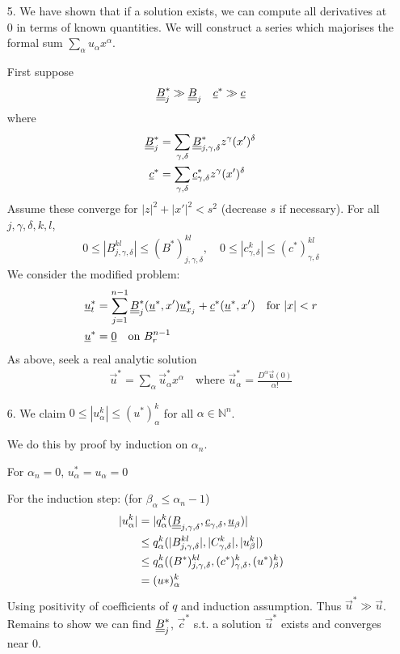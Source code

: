 \documentclass[10pt,a4paper]{report}
\newenvironment{proof}
{\begin{changemargin}{1cm}{0.5cm} 
	}%
	{\end{changemargin}
}
\begin{document}
\begin{proof}
\begin{itemize}
\item[5.] We have shown that if a solution exists, we can compute all derivatives at $0$ in terms of known quantities. We will construct a series which majorises the formal sum $\sum_{\alpha} u_{\alpha}x^{\alpha}$.

\quad First suppose 
\begin{align*}
\underline{\underline{B}}_j^{*} \gg \underline{\underline{B}}_j \quad \underline{c}^* \gg \underline{c}
\end{align*}
where
\begin{align*}
\underline{\underline{B}}_j^{*} &= \sum_{\gamma, \delta} \underline{\underline{B}}_{j,\gamma,\delta}^{*} z^{\gamma} (x')^{\delta} \\
\underline{c}^* &= \sum_{\gamma, \delta} \underline{c}_{\gamma,\delta}^{*} z^{\gamma} (x')^{\delta}
\end{align*}
Assume these converge for $|z|^2 + |x'|^2 <s^2$ (decrease $s$ if necessary). For all $j,\gamma, \delta, k,l$,
\begin{align*}
0\leq |B^{kl}_{j,\gamma,\delta}| \leq (B^*)^{kl}_{j,\gamma,\delta}, \quad 0\leq |c^k_{\gamma, \delta} | \leq (c^*)^{kl}_{\gamma, \delta}
\end{align*}
We consider the modified problem:
\begin{align*}
\underline{u}^*_t &= \sum_{j=1}^{n-1} \underline{\underline{B}}^*_j (\underline{u}^*, x') \underline{u}^*_{x_j} + \underline{c}^*(\underline{u}^*,x') \quad \text{for } |x| <r \\
\underline{u}^* &= \underline{0} \quad \text{on } B_r^{n-1}
\end{align*}
As above, seek a real analytic solution
\begin{align*}
\vec{u}^* = \sum_{\alpha} \vec{u}^*_{\alpha} x^{\alpha} \quad \text{where } \vec{u}^*_{\alpha} = \frac{D^{\alpha}\vec{u}(0)}{\alpha !}
\end{align*}

\item[6.] We claim $0\leq |u_{\alpha}^k| \leq (u^*)^{k}_{\alpha}$ for all $\alpha \in \mathbb{N}^n$.

We do this by proof by induction on $\alpha_n$.

For $\alpha_n =0$, $u_{\alpha}^* = u_{\alpha} =0$

For the induction step: (for $\beta_{\alpha} \leq \alpha_n -1$)
\begin{align*}
|u_{\alpha}^k| &= |q_{\alpha}^k(\underline{\underline{B}}_{j,\gamma,\delta}, \underline{c}_{\gamma,\delta},\underline{u}_{\beta})| \\
&\leq q_{\alpha}^k ( |B_{j,\gamma,\delta}^{kl}|,|C_{\gamma,\delta}^k|,|u^k_{\beta}|) \\
&\leq q_{\alpha}^k ((B^*)^{kl}_{j,\gamma,\delta},(c^*)^{k}_{\gamma,\delta},(u^*)^{k}_{\beta}) \\
&= (u*)^{k}_{\alpha}
\end{align*}
Using positivity of coefficients of $q$ and induction assumption. Thus $\vec{u}^* \gg \vec{u}$. Remains to show we can find $\underline{\underline{B}}_{j}^*$, $\vec{c}^*$ s.t. a solution $\vec{u}^*$ exists and converges near 0.
\end{itemize}
\end{proof}
\end{document}
